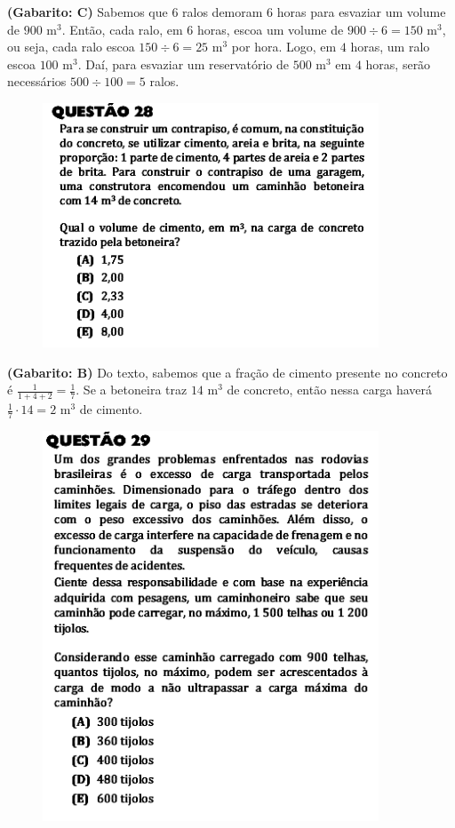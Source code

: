\documentclass[a4paper]{article}
\begin{document}
\par\textbf{(Gabarito: C)} Sabemos que $6$ ralos demoram $6$ horas para esvaziar um volume de $900$ m$^3$. Então, cada ralo, em $6$ horas, escoa um volume de $900\div6 = 150\text{ m}^3$, ou seja, cada ralo escoa $150\div6 = 25\text{ m}^3$ por hora. Logo, em $4$ horas, um ralo escoa $100\text{ m}^3$. Daí, para esvaziar um reservatório de $500$ m$^3$ em $4$ horas, serão necessários $500\div100 = 5$ ralos.
\begin{figure}[H]
	\begin{center}
		\includegraphics[width=10cm]{L2Q28.png}
	\end{center}
\end{figure}
\par\textbf{(Gabarito: B)} Do texto, sabemos que a fração de cimento presente no concreto é $\displaystyle{ \frac{1}{1+4+2} = \frac{1}{7} }$. Se a betoneira traz $14\text{ m}^3$ de concreto, então nessa carga haverá $\displaystyle{ \frac{1}{7}\cdot 14 = 2\text{ m}^3 }$ de cimento.
\begin{figure}[H]
	\begin{center}
		\includegraphics[width=10cm]{L2Q29.png}
	\end{center}
\end{figure}
\end{document}
